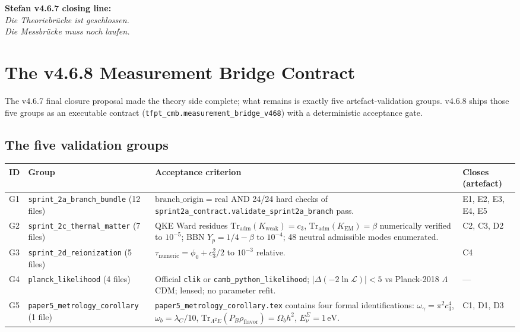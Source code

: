 \documentclass[11pt,a4paper]{article}
\begin{document}
\begin{tfptfrontbox}
\textbf{Stefan v4.6.7 closing line:}\\
\emph{Die Theoriebrücke ist geschlossen.\\
Die Messbrücke muss noch laufen.}
\end{tfptfrontbox}

\section{The v4.6.8 Measurement Bridge Contract}
\label{sec:measurement468}

The v4.6.7 final closure proposal made the theory side complete; what
remains is exactly five artefact-validation groups.  v4.6.8 ships
those five groups as an executable contract
(\texttt{tfpt\_cmb.measurement\_bridge\_v468}) with a deterministic
acceptance gate.

\subsection{The five validation groups}

\begin{center}
\renewcommand{\arraystretch}{1.18}
\begin{tabularx}{\textwidth}{@{}p{}p{}p{}Y@{}}
\toprule
\textbf{ID} & \textbf{Group} & \textbf{Acceptance criterion} & \textbf{Closes (artefact)} \\
\midrule
G1 & \texttt{sprint\_2a\_branch\_bundle} (12 files) &
\(\mathrm{branch\_origin}=\mathrm{real}\) AND 24/24 hard checks of
\texttt{sprint2a\_contract.validate\_sprint2a\_branch} pass.
& E1, E2, E3, E4, E5 \\
G2 & \texttt{sprint\_2c\_thermal\_matter} (7 files) &
QKE Ward residues
\(\mathrm{Tr}_{\mathrm{adm}}(K_{\mathrm{weak}})=c_3\),
\(\mathrm{Tr}_{\mathrm{adm}}(K_{\mathrm{EM}})=\beta\) numerically
verified to \(10^{-5}\); BBN \(Y_p=1/4-\beta\) to \(10^{-4}\); 48
neutral admissible modes enumerated.
& C2, C3, D2 \\
G3 & \texttt{sprint\_2d\_reionization} (5 files) &
\(\tau_{\mathrm{numeric}}=\phi_0+c_3^2/2\) to \(10^{-3}\) relative.
& C4 \\
G4 & \texttt{planck\_likelihood} (4 files) &
Official \texttt{clik} or \texttt{camb\_python\_likelihood};
\(|\Delta(-2\ln\mathcal L)|<5\) vs Planck-2018 \(\Lambda\)CDM;
lensed; no parameter refit.
& --- \\
G5 & \texttt{paper5\_metrology\_corollary} (1 file) &
\texttt{paper5\_metrology\_corollary.tex} contains four formal
identifications: \(\omega_\gamma=\pi^2 c_3^4\),
\(\omega_b=\lambda_C/10\), \(\mathrm{Tr}_{\Lambda^2 E}(P_B\rho_{\mathrm{flavor}})=\Omega_b h^2\),
\(E_\nu^\Sigma=1\,\mathrm{eV}\).
& C1, D1, D3 \\
\bottomrule
\end{tabularx}
\end{center}
\end{document}
